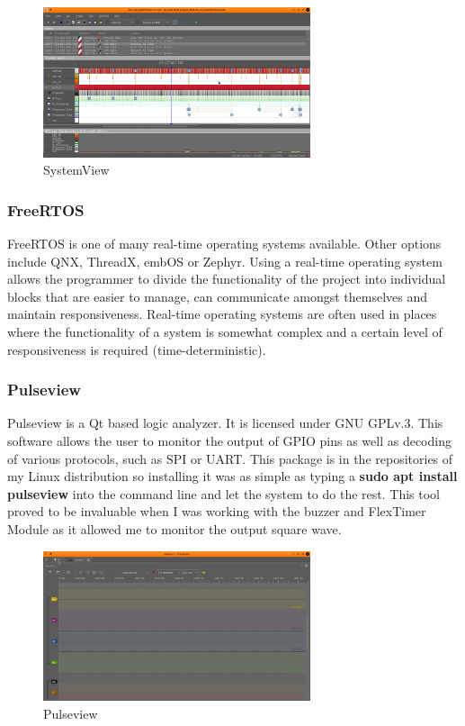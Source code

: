 \documentclass[12pt,a4paper]{article}
\begin{document}
            \begin{figure}[h]
                \centering
                \includegraphics[width=0.7\textwidth]{systemview1}
                \caption{SystemView}
            \end{figure}
        
            \subsubsection{FreeRTOS}
            FreeRTOS is one of many real-time operating systems available. Other options include QNX, 
            ThreadX, embOS or Zephyr. Using a real-time operating system allows the programmer to 
            divide the functionality of the project into individual blocks that are easier to manage, 
            can communicate amongst themselves and maintain responsiveness. Real-time operating
            systems are often used in places where the functionality of a system is somewhat complex and a
            certain level of responsiveness is required (time-deterministic).
            
            \subsubsection{Pulseview}
            Pulseview is a Qt based logic analyzer. It is licensed under GNU GPLv.3. This software  
            allows the user to monitor the output of GPIO pins as well as decoding of various protocols,
            such as SPI or UART. This package is in the repositories of my Linux distribution so 
            installing it was as simple as typing a {\bfseries sudo apt install pulseview} into the command line and let the system to do the rest. This tool proved to be invaluable when 
            I was working with the buzzer and FlexTimer Module as it allowed me to monitor the output
            square wave.
            
            \begin{figure}[h]
                \centering
                \includegraphics[width=0.7\textwidth]{pulseview}
                \caption{Pulseview}
            \end{figure}
        
\end{document}
